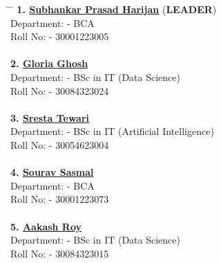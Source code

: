 \documentclass{article}
\begin{document}
\begin{tabbing}
    
    \hspace{5cm} \= \hspace{7cm} \= \kill
    \textbf{1. \underline{Subhankar Prasad Harijan}} (\textbf{LEADER}) \\
    \hspace{0.6cm}Department: - BCA \\
     \hspace{0.6 cm}Roll No: - 30001223005 \\
    
    \\
    \textbf{2. \underline{Gloria Ghosh}} \\
     \hspace{0.6 cm}Department: - BSc in IT (Data Science) \\
    \hspace{0.5 cm} Roll No: - 30084323024 \\
    \\
    \textbf{3. \underline{Sresta Tewari}} \\
    \hspace{0.4 cm} Department: - BSc in IT (Artificial Intelligence) \\
    \hspace{0.4 cm} Roll No: - 30054623004 \\
    \\
    \textbf{4. \underline{Sourav Sasmal}} \\
    \hspace{0.4 cm} Department: - BCA \\
    \hspace{0.4 cm} Roll No: - 30001223073 \\
    \\
    \textbf{5. \underline{Aakash Roy}} \\
     \hspace{0.6 cm}Department: - BSc in IT (Data Science) \\
    \hspace{0.5 cm} Roll No: - 30084323015 \\
\end{tabbing}


\newpage
{}
\end{document}
